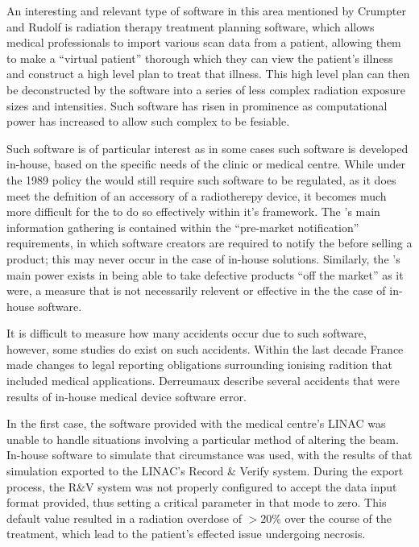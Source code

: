 \documentclass{cshonours}
\begin{document}
An interesting and relevant type of software in this area mentioned by Crumpter and Rudolf is radiation therapy treatment planning software, which allows medical professionals to import various scan data from a patient, allowing them to make a ``virtual patient'' thorough which they can view the patient's illness and construct a high level plan to treat that illness. This high level plan can then be deconstructed by the software into a series of less complex radiation exposure sizes and intensities. Such software has risen in prominence as computational power has increased to allow such complex to be fesiable.

Such software is of particular interest as in some cases such software is developed in-house, based on the specific needs of the clinic or medical centre. While under the 1989 policy the \fda would still require such software to be regulated, as it does meet the defnition of an accessory of a radiotherepy device, it becomes much more difficult for the \fda to do so effectively within it's framework. The \fda's main information gathering is contained within the ``pre-market notification'' requirements, in which software creators are required to notify the \fda before selling a product; this may never occur in the case of in-house solutions. Similarly, the \fda's main power exists in being able to take defective products ``off the market'' as it were, a measure that is not necessarily relevent or effective in the the case of in-house software.

It is difficult to measure how many accidents occur due to such software, however, some studies do exist on such accidents. Within the last decade France made changes to legal reporting obligations surrounding ionising radition that included medical applications. Derreumaux \etal \cite{derreumaux2008lessons} describe several accidents that were results of in-house medical device software error. 

In the first case, the software provided with the medical centre's LINAC was unable to handle situations involving a particular method of altering the beam. In-house software to simulate that circumstance was used, with the results of that simulation exported to the LINAC's Record \& Verify system. During the export process, the R\&V system was not properly configured to accept the data input format provided, thus setting a critical parameter in that mode to zero. This default value resulted in a radiation overdose of $>20\%$ over the course of the treatment, which lead to the patient's effected issue undergoing necrosis.
\end{document}
